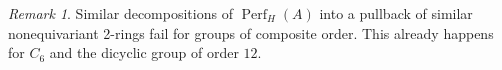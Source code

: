 \documentclass[11pt, a4paper]{article}
\newcommand{\1}{\mathbf{1}}
\DeclareMathOperator{\Perf}{Perf}
\theoremstyle{plain}
\theoremstyle{definition}
\theoremstyle{remark}\numberwithin{equation}{section}
\newtheorem{remark}[equation]{Remark}
\begin{document}

\begin{remark}
    Similar decompositions of $\Perf_H(A)$ into a pullback of similar nonequivariant 2-rings fail for groups of composite order. This already happens for $C_6$ and the dicyclic group of order $12$.
\end{remark}
\end{document}
